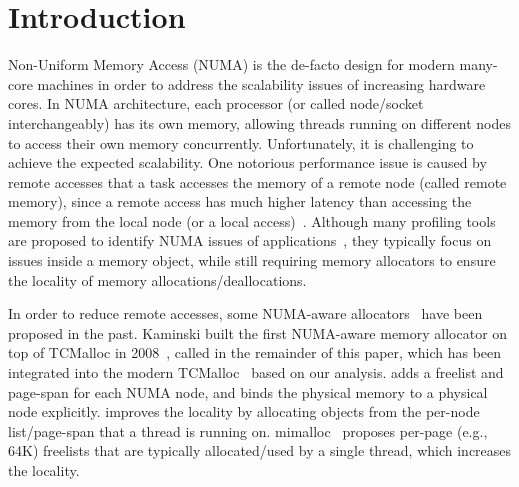
\section{Introduction}
\label{sec:intro}


Non-Uniform Memory Access (NUMA) is the de-facto design for modern many-core machines in order to address the scalability issues of increasing hardware cores. In NUMA architecture, each processor (or called node/socket interchangeably) has its own memory, allowing threads running on different nodes to access their own memory concurrently. Unfortunately, it is challenging to achieve the expected scalability. One notorious performance issue is caused by remote accesses that a task accesses the memory of a remote node (called remote memory), since a remote access has much higher latency than accessing the memory from the local node (or a local access)~\cite{Blagodurov:2011:CNC:2002181.2002182}. Although many profiling tools are proposed to identify NUMA issues of applications~\cite{Intel:VTune, Memphis, Lachaize:2012:MMP:2342821.2342826, XuNuma, NumaMMA, 7847070, NumaPerf}, they typically focus on issues inside a memory object, while still requiring memory allocators to ensure the locality of memory allocations/deallocations. 

In order to reduce remote accesses, some NUMA-aware allocators~\cite{tcmallocnuma, kim2013node, yang2019jarena} have been proposed in the past. Kaminski built the first NUMA-aware memory allocator on top of TCMalloc in 2008~\cite{tcmallocnuma}, called \TN{} in the remainder of this paper, which has been integrated into the modern TCMalloc~\cite{tcmalloc2} based on our analysis. \TN{} adds a freelist and page-span for each NUMA node, and binds the physical memory to a physical node explicitly. \TN{} improves the locality by allocating objects from the per-node list/page-span that a thread is running on. mimalloc~\cite{mimalloc} proposes per-page (e.g., 64K) freelists that are typically allocated/used by a single thread, which increases the locality.



